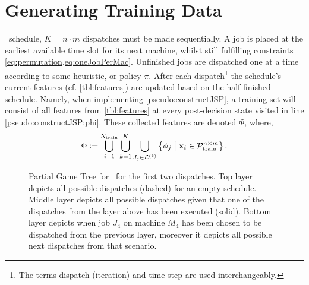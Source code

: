 
\chapter{Generating Training Data}\label{ch:gentrdat} 

 \jsp\ schedule, $K=n\cdot m$ 
dispatches must be made sequentially.
A job is placed at the earliest available time slot for its next machine, 
whilst still fulfilling constraints \cref{eq:permutation,eq:oneJobPerMac}.
Unfinished jobs are dispatched one at a time according to some heuristic, or 
policy $\pi$. 
After each dispatch\footnote{The terms dispatch (iteration) and time step are 
    used interchangeably.} the schedule's current features (cf. 
\cref{tbl:features}) are updated based on the half-finished schedule. Namely, 
when implementing \cref{pseudo:constructJSP}, a training set will consist of 
all features from \cref{tbl:features} at every post-decision state visited in 
line \ref{pseudo:constructJSP:phi}. 
These collected features are denoted $\Phi$, where, 
\begin{equation}\label{eq:Phi}
\Phi:= \bigcup_{i=1}^{N_{\text{train}}} 
\bigcup_{k=1}^K\bigcup_{J_j\in\mathcal{L}^{(k)}} 
\condset{\vphi_j}{\vec{x}_i\in\mathcal{P}^{n\times m}_{\text{train}} }.
\end{equation}

\begin{figure}[p]
    
    \vspace{-27pt}
    \caption[Partial Game Tree for \jsp]{Partial Game Tree for \jsp\ for the 
        first two dispatches. 
        Top layer depicts all possible dispatches (dashed) for an empty 
        schedule. 
        Middle layer depicts all possible dispatches given that one of the 
        dispatches from the layer above has been executed (solid). 
        Bottom layer depicts when job $J_4$ on machine $M_4$ has been chosen to 
        be dispatched from the previous layer, moreover it depicts all possible 
        next dispatches from that scenario.}
    \label{fig:example:gametree}
\end{figure}

\vspace*{-24pt}

